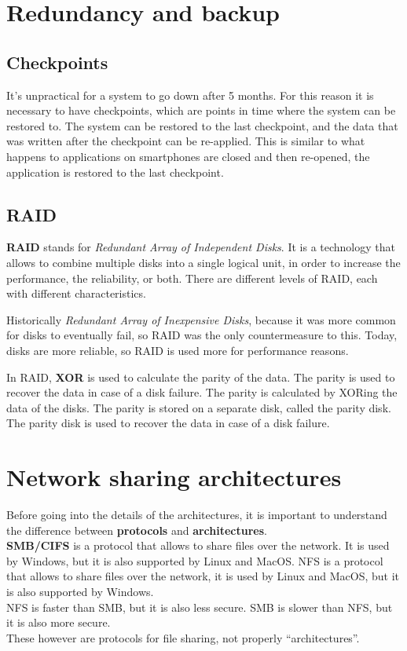 \section{Redundancy and backup}
\subsection{Checkpoints}
It's unpractical for a system to go down after 5 months. For this reason it is necessary to have checkpoints, which are points in time where the system can be restored to. The system can be restored to the last checkpoint, and the data that was written after the checkpoint can be re-applied. This is similar to what happens to applications on smartphones are closed and then re-opened, the application is restored to the last checkpoint.

\subsection{RAID}
\textbf{RAID} stands for \textit{Redundant Array of Independent Disks}. It is a technology that allows to combine multiple disks into a single logical unit, in order to increase the performance, the reliability, or both. There are different levels of RAID, each with different characteristics.

Historically \textit{Redundant Array of Inexpensive Disks}, because it was more common for disks to eventually fail, so RAID was the only countermeasure to this. Today, disks are more reliable, so RAID is used more for performance reasons.

In RAID, \textbf{XOR} is used to calculate the parity of the data. The parity is used to recover the data in case of a disk failure. The parity is calculated by XORing the data of the disks. The parity is stored on a separate disk, called the parity disk. The parity disk is used to recover the data in case of a disk failure.


\section{Network sharing architectures}
Before going into the details of the architectures, it is important to understand the difference between \textbf{protocols} and \textbf{architectures}.\\
\textbf{SMB/CIFS} is a protocol that allows to share files over the network. It is used by Windows, but it is also supported by Linux and MacOS. NFS is a protocol that allows to share files over the network, it is used by Linux and MacOS, but it is also supported by Windows.\\
NFS is faster than SMB, but it is also less secure. SMB is slower than NFS, but it is also more secure.\\
These however are protocols for file sharing, not properly ``architectures''.

